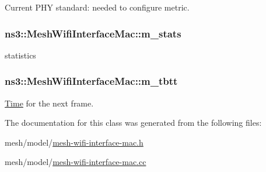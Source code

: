 Current P\+HY standard\+: needed to configure metric. 

\subsubsection[{\texorpdfstring{m\+\_\+stats}{m_stats}}]{ ns3\+::\+Mesh\+Wifi\+Interface\+Mac\+::m\+\_\+stats\hspace{0.3cm}{\ttfamily [private]}}\hypertarget{classns3_1_1MeshWifiInterfaceMac_a3707a5a7f4893aabbbf02b7e95e411c8}{}\label{classns3_1_1MeshWifiInterfaceMac_a3707a5a7f4893aabbbf02b7e95e411c8}


statistics 

\subsubsection[{\texorpdfstring{m\+\_\+tbtt}{m_tbtt}}]{ ns3\+::\+Mesh\+Wifi\+Interface\+Mac\+::m\+\_\+tbtt\hspace{0.3cm}{\ttfamily [private]}}\hypertarget{classns3_1_1MeshWifiInterfaceMac_af979a6faf2261a0bde9ebb5cdcb15450}{}\label{classns3_1_1MeshWifiInterfaceMac_af979a6faf2261a0bde9ebb5cdcb15450}


\hyperlink{classns3_1_1Time}{Time} for the next frame. 



The documentation for this class was generated from the following files\+:\begin{DoxyCompactItemize}
\item 
mesh/model/\hyperlink{mesh-wifi-interface-mac_8h}{mesh-\/wifi-\/interface-\/mac.\+h}\item 
mesh/model/\hyperlink{mesh-wifi-interface-mac_8cc}{mesh-\/wifi-\/interface-\/mac.\+cc}\end{DoxyCompactItemize}
